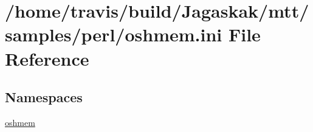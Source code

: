 \hypertarget{oshmem_8ini}{\section{/home/travis/build/\-Jagaskak/mtt/samples/perl/oshmem.ini File Reference}
\label{oshmem_8ini}
}
\subsection*{Namespaces}
\begin{DoxyCompactItemize}
\item 
\hyperlink{namespaceoshmem}{oshmem}
\end{DoxyCompactItemize}

